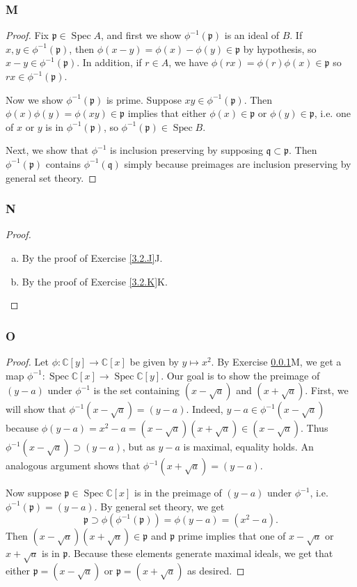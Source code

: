 \documentclass{article}
\newcommand{\C}{\mathbb{C}}
\newcommand{\frkp}{\mathfrak{p}}
\newcommand{\frkq}{\mathfrak{q}}
\DeclareMathOperator{\Spec}{\mathrm{Spec}}
\begin{document}
\subsubsection{M}\label{3.2.M}
\begin{proof}
    Fix $\frkp \in \Spec A$, and first we show $\phi^{-1}(\frkp)$ is an ideal of $B$. If $x,y\in \phi^{-1}(\frkp)$, then $\phi(x-y)=\phi(x)-\phi(y)\in \frkp$ by hypothesis, so $x-y\in \phi^{-1}(\frkp)$. In addition, if $r\in A$, we have $\phi(rx)=\phi(r)\phi(x)\in \frkp$ so $rx\in \phi^{-1}(\frkp)$.

    Now we show $\phi^{-1}(\frkp)$ is prime. Suppose $xy\in \phi^{-1}(\frkp)$. Then $\phi(x)\phi(y) =\phi(xy)\in \frkp$ implies that either $\phi(x)\in \frkp$ or $\phi(y)\in \frkp$, i.e. one of $x$ or $y$ is in $\phi^{-1}(\frkp)$, so $\phi^{-1}(\frkp)\in \Spec B$.

    Next, we show that $\phi^{-1}$ is inclusion preserving by supposing $\frkq \subset \frkp$. Then $\phi^{-1}(\frkp)$ contains $\phi^{-1}(\frkq)$ simply because preimages are inclusion preserving by general set theory.
\end{proof}
\subsubsection{N}\label{3.2.N}
\begin{proof}
    \begin{enumerate}[(a)]
        \item By the proof of Exercise \ref{3.2.J}J.
        \item By the proof of Exercise \ref{3.2.K}K.
    \end{enumerate}
\end{proof}
\subsubsection{O}\label{3.2.O}
\begin{proof}
    Let $\phi:\C[y]\to \C[x]$ be given by $y\mapsto x^2$. By Exercise \ref{3.2.M}M, we get a map $\phi^{-1}:\Spec \C[x]\to \Spec \C[y]$. Our goal is to show the preimage of $(y-a)$ under $\phi^{-1}$ is the set containing $(x-\sqrt{a})$ and $(x+\sqrt{a})$. First, we will show that $\phi^{-1}(x-\sqrt a)=(y-a)$. Indeed, $y-a\in \phi^{-1}(x-\sqrt a)$ because $\phi(y-a)=x^2-a=(x-\sqrt a)(x+\sqrt a) \in (x-\sqrt a)$. Thus $\phi^{-1}(x-\sqrt a)\supset (y-a)$, but as $y-a$ is maximal, equality holds. An analogous argument shows that $\phi^{-1}(x+\sqrt a)=(y-a)$.

    Now suppose $\frkp \in \Spec \C[x]$ is in the preimage of $(y-a)$ under $\phi^{-1}$, i.e. $\phi^{-1}(\frkp)=(y-a)$. By general set theory, we get
    \[
    \frkp \supset \phi(\phi^{-1}(\frkp)) = \phi(y-a)=(x^2-a).
    \]
    Then $(x-\sqrt a)(x+\sqrt a) \in \frkp$ and $\frkp$ prime implies that one of $x-\sqrt{a}$ or $x+\sqrt a$ is in $\frkp$. Because these elements generate maximal ideals, we get that either $\frkp = (x-\sqrt a)$ or $\frkp = (x+\sqrt a)$ as desired.
\end{proof}
\end{document}
